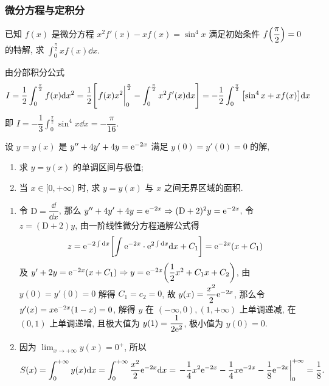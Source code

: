 \subsubsection{微分方程与定积分}

\begin{example}
    已知 $f(x)$ 是微分方程 $x^2f'(x)-xf(x)=\sin^4x$ 满足初始条件 $f\qty(\dfrac{\pi  }{2})=0$ 的特解, 求 $\displaystyle \int_{0}^{\frac{\pi}{2}} xf(x) \dd x.$
\end{example}
\begin{solution}
    由分部积分公式
    $$
    I=\dfrac{1}{2}\int_{0}^{\frac{\pi}{2}}f(x)\dd x^2=\dfrac{1}{2}\qty[\eval{f(x)x^2}_{0}^{\frac{\pi}{2}}-\int_{0}^{\frac{\pi}{2}}x^2f'(x)\dd x]=-\dfrac{1}{2}\int_{0}^{\frac{\pi}{2}}\qty[\sin^4x+xf(x)]\dd x
    $$
    即 $\displaystyle I=-\dfrac{1}{3}\int_{0}^{\frac{\pi}{2}} \sin^4x \dd x=-\dfrac{\pi}{16}.$
\end{solution}

\begin{example}
    设 $y=y(x)$ 是 $y''+4y'+4y=\mathrm{e} ^{-2x}$ 满足 $y(0)=y'(0)=0$ 的解,
    \begin{enumerate}[label=(\arabic{*})]
        \item 求 $y=y(x)$ 的单调区间与极值;
        \item 当 $x\in[0,+\infty)$ 时, 求 $y=y(x)$ 与 $x$ 之间无界区域的面积.
    \end{enumerate}
\end{example}
\begin{solution}
    \begin{enumerate}[label=(\arabic{*})]
        \item 令 $\mathrm{D}=\dfrac{\dd}{\dd x}$, 那么 $y''+4y'+4y=\mathrm{e} ^{-2x}\Rightarrow(\mathrm{D}+2)^2y=\mathrm{e} ^{-2x}$, 令 $z=(\mathrm{D}+2)y$, 由一阶线性微分方程通解公式得 $$z=\mathrm{e} ^{-2\int \dd x}\qty[\int \mathrm{e} ^{-2x}\cdot \mathrm{e} ^{2\int \dd x}\dd x+C_1]=\mathrm{e} ^{-2x}\qty(x+C_1)$$
        及 $y'+2y=\mathrm{e} ^{-2x}\qty(x+C_1)\Rightarrow y=\mathrm{e} ^{-2x}\qty(\dfrac{1}{2}x^2+C_1 x+C_2)$, 由 $y(0)=y'(0)=0$ 解得 $C_1=c_2=0$, 故 $y(x)=\dfrac{x^2}{2}\mathrm{e} ^{-2x}$, 那么令 $y'(x)=x\mathrm{e} ^{-2x}(1-x)=0$, 解得 $y$ 在 $(-\infty,0),(1,+\infty)$ 上单调递减, 在 $(0,1)$ 上单调递增, 且极大值为 $y(1)=\dfrac{1}{2\mathrm{e} ^{2}}$, 极小值为 $y(0)=0.$
        \item 因为 $ \displaystyle \lim_{x \to +\infty} y(x)=0^+$, 所以 
        $$
        S(x)=\int_{0}^{+\infty} y(x) \dd x=\int_{0}^{+\infty} \dfrac{x^2}{2}\e ^{-2x} \dd x=\eval{-\dfrac{1}{4}x^2 \e ^{-2x}-\dfrac{1}{4}x \e ^{-2x}-\dfrac{1}{8}\e ^{-2x}}_{0}^{+\infty}=\dfrac{1}{8}.
        $$
    \end{enumerate}
\end{solution}

